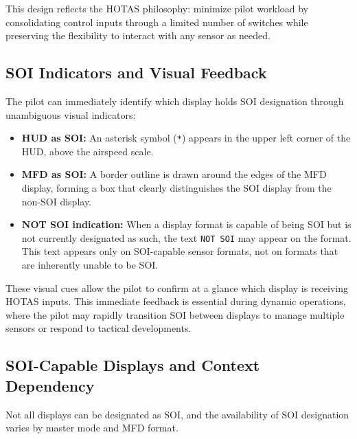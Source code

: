 \documentclass[11pt, a4paper, twoside]{report}
\begin{document}
This design reflects the HOTAS philosophy: minimize pilot workload by consolidating control inputs through a limited number of switches while preserving the flexibility to interact with any sensor as needed.

\subsection{SOI Indicators and Visual Feedback}
\label{sec:C2-S1-S2}

The pilot can immediately identify which display holds SOI designation through unambiguous visual indicators:

\begin{itemize}
	\item \textbf{HUD as SOI:} An asterisk symbol (\texttt{*}) appears in the upper left corner of the HUD, above the airspeed scale.
	\item \textbf{MFD as SOI:} A border outline is drawn around the edges of the MFD display, forming a box that clearly distinguishes the SOI display from the non-SOI display.
	\item \textbf{NOT SOI indication:} When a display format is capable of being SOI but is not currently designated as such, the text \texttt{NOT SOI} may appear on the format. This text appears only on SOI-capable sensor formats, not on formats that are inherently unable to be SOI.
\end{itemize}

These visual cues allow the pilot to confirm at a glance which display is receiving HOTAS inputs. This immediate feedback is essential during dynamic operations, where the pilot may rapidly transition SOI between displays to manage multiple sensors or respond to tactical developments.

\subsection{SOI-Capable Displays and Context Dependency}
\label{sec:C2-S1-S3}

Not all displays can be designated as SOI, and the availability of SOI designation varies by master mode and MFD format.
\end{document}
